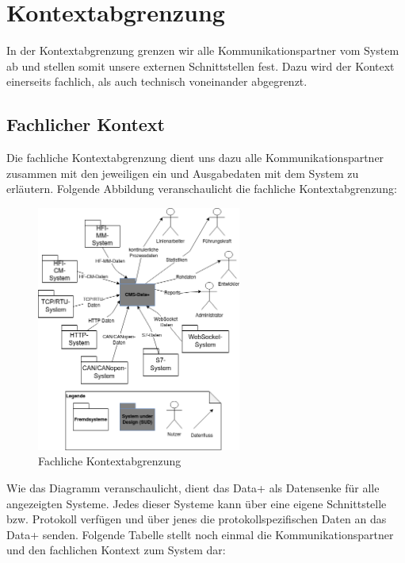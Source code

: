 \chapter{Kontextabgrenzung}
\label{ch:Kontextabgrenzung}
In der Kontextabgrenzung grenzen wir alle Kommunikationspartner vom System ab und stellen somit unsere externen Schnittstellen fest. Dazu wird der Kontext einerseits fachlich, als auch technisch voneinander abgegrenzt.
\section{Fachlicher Kontext}
Die fachliche Kontextabgrenzung dient uns dazu alle Kommunikationspartner zusammen mit den jeweiligen ein und Ausgabedaten mit dem System zu erläutern. Folgende Abbildung veranschaulicht die fachliche Kontextabgrenzung:
\begin{figure}[h]
	\centering
	\includegraphics[width=0.6\textwidth]{Graphics/fachliche_kontextabgrenzung.png}
	\caption{Fachliche Kontextabgrenzung}
	\label{fig:fachliche_kontextabgrenzung}
\end{figure}

Wie das Diagramm veranschaulicht, dient das Data+ als Datensenke für alle angezeigten Systeme. Jedes dieser Systeme kann über eine eigene Schnittstelle bzw. Protokoll verfügen und über jenes die protokollspezifischen Daten an das Data+ senden.
Folgende Tabelle stellt noch einmal die Kommunikationspartner und den fachlichen Kontext zum System dar:

